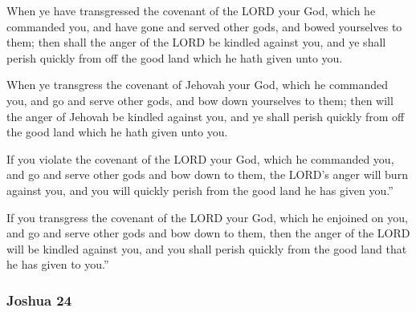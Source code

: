 			When ye have transgressed the covenant of the LORD your God, which he commanded you, and have gone and served other gods, and bowed yourselves to them; then shall the anger of the LORD be kindled against you, and ye shall perish quickly from off the good land which he hath given unto you.

			\begin{versebox}
					\item[BHS] 
					\item[ASV] When ye transgress the covenant of Jehovah your God, which he commanded you, and go and serve other gods, and bow down yourselves to them; then will the anger of Jehovah be kindled against you, and ye shall perish quickly from off the good land which he hath given unto you.
					\item[NIV] If you violate the covenant of the LORD your God, which he commanded you, and go and serve other gods and bow down to them, the LORD’s anger will burn against you, and you will quickly perish from the good land he has given you.”
					\item[NRSV] If you transgress the covenant of the LORD your God, which he enjoined on you, and go and serve other gods and bow down to them, then the anger of the LORD will be kindled against you, and you shall perish quickly from the good land that he has given to you.”
			\end{versebox}
	\subsubsection{Joshua 24} %
		\label{JOSHUA-24}

